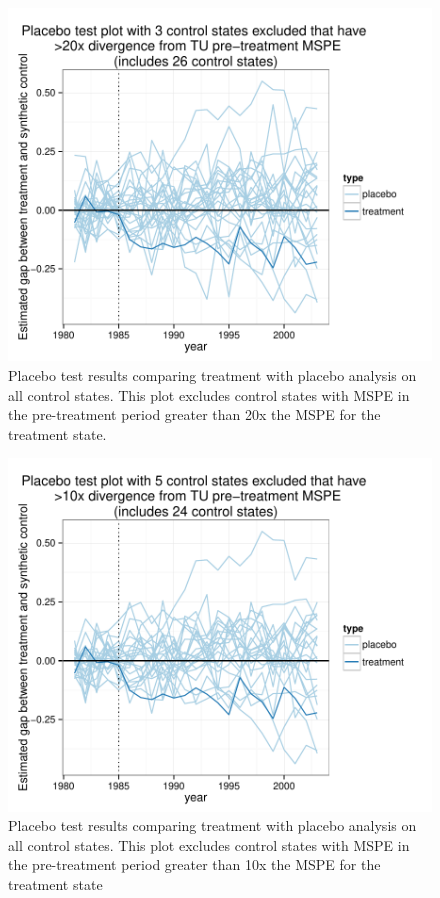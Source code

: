 \begin{figure}[htbp]
\begin{center}
\includegraphics{img-placeboTest20.pdf}
\caption{Placebo test results comparing treatment with placebo analysis on all control states.  This plot excludes control states with MSPE in the pre-treatment period greater than 20x the MSPE for the treatment state.}
\label{fig:ps20}
\end{center}
\end{figure}

\begin{figure}[htbp]
\begin{center}
\includegraphics{img-placeboTest10.pdf}
\caption{Placebo test results comparing treatment with placebo analysis on all control states.  This plot excludes control states with MSPE in the pre-treatment period greater than 10x the MSPE for the treatment state}
\label{fig:ps10}
\end{center}
\end{figure}


